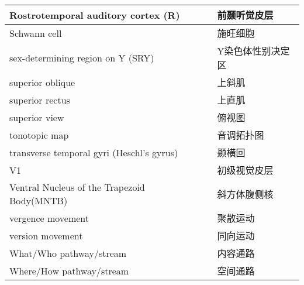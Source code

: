 \begin{longtable}{lll}
	\midrule
	Rostrotemporal auditory cortex (R)   && 前颞听觉皮层 \\
	
	\midrule
	Schwann cell   && 施旺细胞 \\
	
	\midrule
	sex-determining region on Y (SRY)   && Y染色体性别决定区 \\
	
	\midrule
	superior oblique   && 上斜肌 \\
	
	\midrule
	superior rectus   && 上直肌 \\
	
	\midrule
	superior view   && 俯视图 \\
	
	\midrule
	tonotopic map   && 音调拓扑图  \\
	
	\midrule
	transverse temporal gyri (Heschl's gyrus)   && 颞横回  \\
	
	\midrule
	V1   && 初级视觉皮层  \\
	
	\midrule
	Ventral Nucleus of the Trapezoid Body(MNTB)   && 斜方体腹侧核  \\
	
	\midrule
	vergence movement   && 聚散运动  \\
	
	\midrule
	version movement   && 同向运动  \\
	
	\midrule
	What/Who pathway/stream  && 内容通路  \\
	
	\midrule
	Where/How pathway/stream && 空间通路  \\
	
	
	\bottomrule  

\end{longtable}

